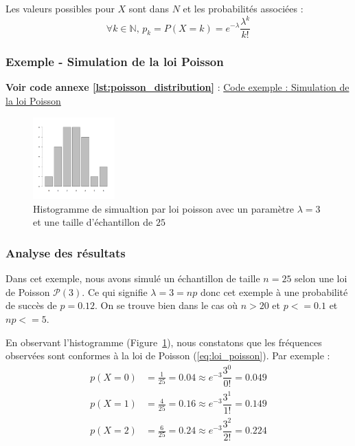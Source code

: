       Les valeurs possibles pour $X$ sont dans $N$ et les probabilités associées : 
      \begin{equation}
        \forall k\in \mathbb N,\, p_k=P(X=k)=e^{-\lambda}\dfrac{\lambda^k}{k!}
        \label{eq:loi_poisson}
      \end{equation}

    \subsubsection{Exemple - Simulation de la loi Poisson}

      \textbf{Voir code annexe \ref{lst:poisson_distribution}} : \hyperlink{\ref{lst:poisson_distribution}}{Code exemple : Simulation de la loi Poisson}

      \begin{figure}[H]
        \centering
        \includegraphics[width=0.28\textwidth]{4_attachments/figures/output5.png}
        \caption{Histogramme de simualtion par loi poisson avec un paramètre $\lambda=3$ et une taille d'échantillon de $25$}
        \label{fig:histogramme_poisson}
      \end{figure}

      \subsubsection{Analyse des résultats}
      Dans cet exemple, nous avons simulé un échantillon de taille $n=25$ selon une loi de Poisson $\mathcal P(3)$. Ce qui signifie $\lambda=3=np$ donc cet exemple à une probabilité de succès de $p=0.12$.
      On se trouve bien dans le cas où $n>20$ et $p<=0.1$ et $np<=5$.

      En observant l'histogramme (Figure~\ref{fig:histogramme_poisson}), nous constatons que les fréquences observées sont conformes à la loi de Poisson (\ref{eq:loi_poisson}). Par exemple :
      \[
        \begin{array}{ll}   
          p(X=0) &= \frac{1}{25} = 0.04 \approx e^{-3}\dfrac{3^0}{0!} = 0.049 \\
          p(X=1) &= \frac{4}{25} = 0.16 \approx e^{-3}\dfrac{3^1}{1!} = 0.149 \\ 
          p(X=2) &= \frac{6}{25} = 0.24 \approx e^{-3}\dfrac{3^2}{2!} = 0.224
        \end{array}
      \]

